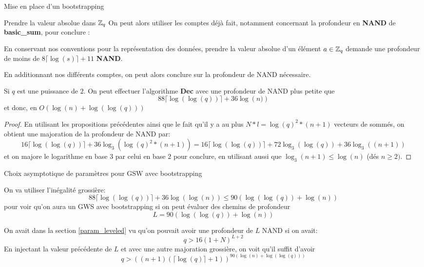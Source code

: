 \begin{section}{Mise en place d'un bootstrapping}
\begin{subsection}{Prendre la valeur absolue dans $\mathbb{Z}_q$}
	On peut alors utiliser les comptes déjà fait, notamment concernant la profondeur en \textbf{NAND} de \textbf{basic\_sum}, pour conclure :

\begin{prop}
	En conservant nos conventions pour la représentation des données,
	prendre la valeur absolue d'un élément $a\in \mathbb{Z}_q$ demande une
	profondeur de moins de $8\lceil \log(s) \rceil + 11$ \textbf{NAND}.
\end{prop}
En additionnant nos différents comptes, on peut alors conclure sur la
profondeur de NAND nécessaire.
\begin{thm} \label{size_dec}
	Si $q$ est une puissance de $2$.
	On peut effectuer 
	l'algorithme \textbf{Dec} avec une profondeur de NAND plus petite que
	\[88 \lceil \log(\log(q)) \rceil + 36 \log\left(n)\right) \]
	et donc, en $O(\log(n) + \log(\log(q)))$
\end{thm}
\begin{proof}
En utilisant les propositions précédentes ainsi que le fait qu'il y a au plus $N*l = \log(q)^2 * (n+1)$ vecteurs de
sommés, on obtient une majoration de la profondeur de NAND par:
\[16 \lceil \log(\log(q)) \rceil + 36 \log_3\left(\log(q)^2
*(n+1)\right) = 16 \lceil \log(\log(q)) \rceil + 72 \log_3(\log(q)) + 36 \log_3\left((n+1)\right) \]
et on majore le logarithme en base $3$ par celui en base $2$ pour conclure, en
utilisant aussi que $\log_3(n+1) \leq \log(n)$ (dés $n \geq 2)$.
\end{proof}
\end{subsection}
\begin{subsection}{Choix asymptotique de paramètres pour GSW avec bootstrapping}

On va utiliser l'inégalité grossière:
\[
88 \lceil\log(\log(q))\rceil + 36 \log(\log(n)) \leq 90\left(\log(\log(q)) + \log(n)\right) \]
pour voir qu'on aura un GWS avec bootstrapping si on peut évaluer des chemins
de profondeur
\[ L = 90 \left(\log(\log(q)) + \log(n)\right) \]

On avait dans la section \ref{param_leveled} vu qu'on pouvait avoir une
profondeur de $L$ NAND si on avait: 
\begin{equation}
q > 16 {(1+N)}^{L+2}
\end{equation}
En injectant la valeur précédente de $L$ et avec une autre majoration
grossière, on voit qu'il suffit d'avoir
\begin{equation}
q > {\left((n+1)(\lceil \log(q) \rceil + 1 )\right)}^{90 \left(\log(n) +
\log(\log(q))\right)}
\end{equation}


\end{subsection}
\end{section}
